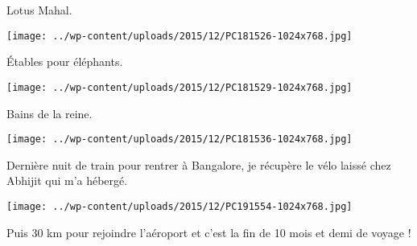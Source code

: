 Lotus Mahal.
\begin{center} \texttt{[image: ../wp-content/uploads/2015/12/PC181526-1024x768.jpg]} \end{center}
\vspace{-\topsep}
\pagebreak

Étables pour éléphants.
\begin{center} \texttt{[image: ../wp-content/uploads/2015/12/PC181529-1024x768.jpg]} \end{center}

Bains de la reine.
\begin{center} \texttt{[image: ../wp-content/uploads/2015/12/PC181536-1024x768.jpg]} \end{center}
\vspace{-\topsep}
\pagebreak

Dernière nuit de train pour rentrer à Bangalore, je récupère le vélo laissé chez Abhijit qui m'a hébergé. 
\vspace{2mm}
\begin{center} \texttt{[image: ../wp-content/uploads/2015/12/PC191554-1024x768.jpg]} \end{center}
\vspace{2mm}

Puis 30 km pour rejoindre l'aéroport et c'est la fin de 10 mois et demi de voyage !
